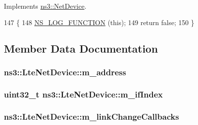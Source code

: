 Implements \hyperlink{classns3_1_1NetDevice_a04793d220b54c40e110ebf86dae5b25c}{ns3\+::\+Net\+Device}.


\begin{DoxyCode}
147 \{
148   \hyperlink{log-macros-disabled_8h_a90b90d5bad1f39cb1b64923ea94c0761}{NS\_LOG\_FUNCTION} (\textcolor{keyword}{this});
149   \textcolor{keywordflow}{return} \textcolor{keyword}{false};
150 \}
\end{DoxyCode}


\subsection{Member Data Documentation}
\subsubsection[{\texorpdfstring{m\+\_\+address}{m_address}}]{ ns3\+::\+Lte\+Net\+Device\+::m\+\_\+address\hspace{0.3cm}{\ttfamily [private]}}\hypertarget{classns3_1_1LteNetDevice_a9553f544022e4a5d4fcb955f47725c9e}{}\label{classns3_1_1LteNetDevice_a9553f544022e4a5d4fcb955f47725c9e}
\subsubsection[{\texorpdfstring{m\+\_\+if\+Index}{m_ifIndex}}]{\setlength{\rightskip}{0pt plus 5cm}uint32\+\_\+t ns3\+::\+Lte\+Net\+Device\+::m\+\_\+if\+Index\hspace{0.3cm}{\ttfamily [private]}}\hypertarget{classns3_1_1LteNetDevice_add30cf197dbde3f91a10034465e00d4c}{}\label{classns3_1_1LteNetDevice_add30cf197dbde3f91a10034465e00d4c}
\subsubsection[{\texorpdfstring{m\+\_\+link\+Change\+Callbacks}{m_linkChangeCallbacks}}]{ ns3\+::\+Lte\+Net\+Device\+::m\+\_\+link\+Change\+Callbacks\hspace{0.3cm}{\ttfamily [private]}}\hypertarget{classns3_1_1LteNetDevice_a9e241bac3c6392f38b6d609a8244e497}{}\label{classns3_1_1LteNetDevice_a9e241bac3c6392f38b6d609a8244e497}

